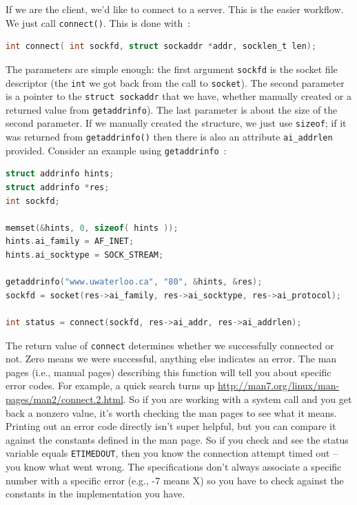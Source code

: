 \documentclass[a4paper]{report}
\begin{document}
If we are the client, we'd like to connect to a server. This is the easier workflow. We just call \texttt{connect()}. This is done with~\cite{apunix}:

\begin{lstlisting}[language=C]
int connect( int sockfd, struct sockaddr *addr, socklen_t len); 
\end{lstlisting}

The parameters are simple enough: the first argument \texttt{sockfd} is the socket file descriptor (the \texttt{int} we got back from the call to \texttt{socket}). The second parameter is a pointer to the \texttt{struct sockaddr} that we have, whether manually created or a returned value from \texttt{getaddrinfo}). The last parameter is about the size of the second parameter. If we manually created the structure, we just use \texttt{sizeof}; if it was returned from \texttt{getaddrinfo()} then there is also an attribute \texttt{ai\_addrlen} provided. Consider an example using \texttt{getaddrinfo}~\cite{getaddrinfo}:

\begin{lstlisting}[language=C]
struct addrinfo hints;
struct addrinfo *res;
int sockfd;

memset(&hints, 0, sizeof( hints ));
hints.ai_family = AF_INET;
hints.ai_socktype = SOCK_STREAM;

getaddrinfo("www.uwaterloo.ca", "80", &hints, &res);
sockfd = socket(res->ai_family, res->ai_socktype, res->ai_protocol);

int status = connect(sockfd, res->ai_addr, res->ai_addrlen);
\end{lstlisting}

The return value of \texttt{connect} determines whether we successfully connected or not. Zero means we were successful, anything else indicates an error. The man pages (i.e., manual pages) describing this function will tell you about specific error codes. For example, a quick search turns up \url{http://man7.org/linux/man-pages/man2/connect.2.html}. So if you are working with a system call and you get back a nonzero value, it's worth checking the man pages to see what it means. Printing out an error code directly isn't super helpful, but you can compare it against the constants defined in the man page. So if you check and see the status variable equals \texttt{ETIMEDOUT}, then you know the connection attempt timed out -- you know what went wrong. The specifications don't always associate a specific number with a specific error (e.g., -7 means X) so you have to check against the constants in the implementation you have.
\end{document}

